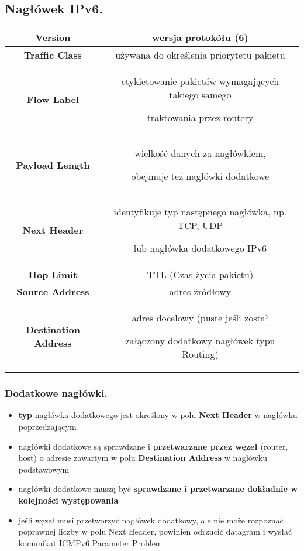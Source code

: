\documentclass[../main.tex]{subfiles}
\begin{document}
    \subsection{Nagłówek IPv6.}
    \begin{tabular}{|c|c|}
        \hline
        \textbf{Version} &
        wersja protokółu (6)\\
        \hline
        \textbf{Traffic Class} &
        używana do określenia priorytetu pakietu\\
        \hline

        \textbf{Flow Label} &
        etykietowanie pakietów wymagających takiego samego

        traktowania przez routery\\
        \hline

        \textbf{Payload Length} &
        wielkość danych za nagłówkiem,

        obejmuje też nagłówki dodatkowe\\
        \hline

        \textbf{Next Header} &
        identyfikuje typ następnego nagłówka, np. TCP, UDP

        lub nagłówka dodatkowego IPv6\\
        \hline

        \textbf{Hop Limit} &
        TTL (Czas życia pakietu)\\
        \hline

        \textbf{Source Address} &
        adres źródłowy\\
        \hline

        \textbf{Destination Address} &
        adres docelowy (puste jeśli został

        załączony dodatkowy nagłówek typu Routing)\\
        \hline
    \end{tabular}


    \subsubsection{Dodatkowe nagłówki.}
    \begin{itemize}
        \item \textbf{typ} nagłówka dodatkowego jest określony w polu \textbf{Next Header} w nagłówku poprzedzającym
        \item nagłówki dodatkowe są sprawdzane i \textbf{przetwarzane przez węzeł} (router, host) o adresie zawartym w polu \textbf{Destination Address} w nagłówku podstawowym
        \item nagłówki dodatkowe muszą być \textbf{sprawdzane i przetwarzane dokładnie w kolejności występowania}
        \item jeśli węzeł musi przetworzyć nagłówek dodatkowy, ale nie może rozpoznać poprawnej liczby w polu Next Header, powinien odrzucić datagram i wysłać komunikat ICMPv6 Parameter Problem
    \end{itemize}
\end{document}
